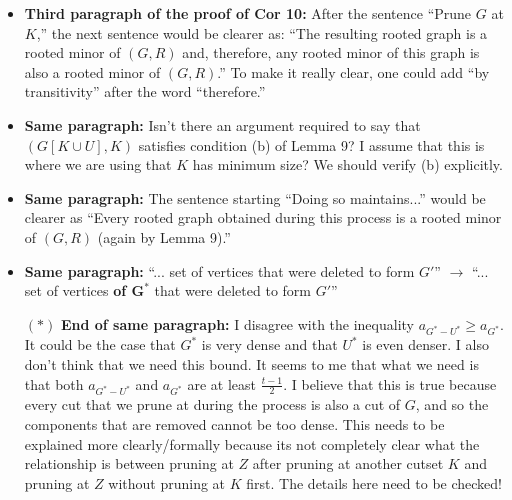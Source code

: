 \documentclass[11 pt]{article}
\theoremstyle{definition}
\theoremstyle{case}
\numberwithin{equation}{section}
\begin{document}
\begin{itemize}
\item \textbf{Third paragraph of the proof of Cor 10:} After the sentence ``Prune $G$ at $K$,'' the next sentence would be clearer as: ``The resulting rooted graph is a rooted minor of $(G,R)$ and, therefore, any rooted minor of this graph is also a rooted minor of $(G,R)$.'' To make it really clear, one could add ``by transitivity'' after the word ``therefore.''
\item \textbf{Same paragraph:} Isn't there an argument required to say that $(G[K\cup U],K)$ satisfies condition (b) of Lemma 9? I assume that this is where we are using that $K$ has minimum size? We should verify (b) explicitly. 
\item \textbf{Same paragraph:} The sentence starting ``Doing so maintains...'' would be clearer as ``Every rooted graph obtained during this process is a rooted minor of $(G,R)$ (again by Lemma 9).''
\item \textbf{Same paragraph:} ``... set of vertices that were deleted to form $G'$'' $\to$ ``... set of vertices \textbf{of $\boldsymbol{G^*}$} that were deleted to form $G'$''
\item[$\boldsymbol{(*)}$] \textbf{End of same paragraph:} I disagree with the inequality $a_{G^*-U^*}\geq a_{G^*}$. It could be the case that $G^*$ is very dense and that $U^*$ is even denser. I also don't think that we need this bound. It seems to me that what we need is that both $a_{G^*-U^*}$ and $a_{G^*}$ are at least $\frac{t-1}{2}$. I believe that this is true because every cut that we prune at during the process is also a cut of $G$, and so the components that are removed cannot be too dense. This needs to be explained more clearly/formally because its not completely clear what the relationship is between pruning at $Z$ after pruning at another cutset $K$ and pruning at $Z$ without pruning at $K$ first. The details here need to be checked!


\end{itemize}
\end{document}
